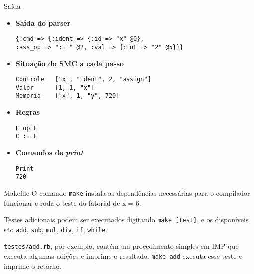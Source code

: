 \documentclass{beamer}
\begin{document}
\begin{frame}[fragile]{Saída}

\begin{itemize}
\item \textbf{Saída do parser}
\begin{verbatim}
{:cmd => {:ident => {:id => "x" @0},
:ass_op => ":= " @2, :val => {:int => "2" @5}}}
\end{verbatim}

\item \textbf{Situação do SMC a cada passo}
\begin{verbatim}
Controle   ["x", "ident", 2, "assign"]
Valor      [1, 1, "x"]
Memoria    ["x", 1, "y", 720]
\end{verbatim}

\item \textbf{Regras}
\begin{verbatim}
E op E
C := E
\end{verbatim}

\item \textbf{Comandos de \textit{print}}
\begin{verbatim}
Print
720
\end{verbatim}

\end{itemize}

\end{frame}

\begin{frame}[fragile]{Makefile}
O comando \verb|make| instala as dependências necessárias para o compilador funcionar e roda o teste do fatorial de x = 6.

Testes adicionais podem ser executados digitando \verb|make [test]|, e os disponíveis são \verb|add|, \verb|sub|, \verb|mul|, \verb|div|, \verb|if|, \verb|while|.

\verb|testes/add.rb|, por exemplo, contém um procedimento simples em IMP que executa algumas adições e imprime o resultado. \verb|make add| executa esse teste e imprime o retorno.

\end{frame}
\end{document}
